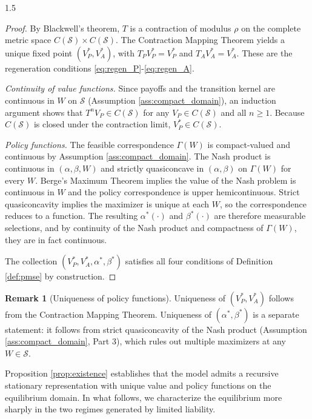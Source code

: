 \documentclass[12pt]{article}
\theoremstyle{definition}
\newtheorem{remark}{Remark}[section]
\theoremstyle{plain}
\begin{document}
\begin{spacing}{1.5}
\begin{proof}
By Blackwell's theorem, $T$ is a contraction of modulus $\rho$ on the complete metric space $C(\mathcal{S}) \times C(\mathcal{S})$. The Contraction Mapping Theorem \parencite[Theorem 3.2]{stokey1989} yields a unique fixed point $(V_P^*, V_A^*)$, with $T_P V_P^* = V_P^*$ and $T_A V_A^* = V_A^*$. These are the regeneration conditions \eqref{eq:regen_P}-\eqref{eq:regen_A}.

\textit{Continuity of value functions.} Since payoffs and the transition kernel are continuous in $W$ on $\mathcal{S}$ (Assumption \ref{ass:compact_domain}), an induction argument shows that $T^n V_P \in C(\mathcal{S})$ for any $V_P \in C(\mathcal{S})$ and all $n \geq 1$. Because $C(\mathcal{S})$ is closed under the contraction limit, $V_P^* \in C(\mathcal{S})$.

\textit{Policy functions.} The feasible correspondence $\Gamma(W)$ is compact-valued and continuous by Assumption \ref{ass:compact_domain}. The Nash product is continuous in $(\alpha,\beta,W)$ and strictly quasiconcave in $(\alpha,\beta)$ on $\Gamma(W)$ for every $W$. Berge's Maximum Theorem implies the value of the Nash problem is continuous in $W$ and the policy correspondence is upper hemicontinuous. Strict quasiconcavity implies the maximizer is unique at each $W$, so the correspondence reduces to a function. The resulting $\alpha^*(\cdot)$ and $\beta^*(\cdot)$ are therefore measurable selections, and by continuity of the Nash product and compactness of $\Gamma(W)$, they are in fact continuous.

The collection $(V_P^*, V_A^*, \alpha^*, \beta^*)$ satisfies all four conditions of Definition \ref{def:pmse} by construction.
\end{proof}

\begin{remark}[Uniqueness of policy functions]
Uniqueness of $(V_P^*, V_A^*)$ follows from the Contraction Mapping Theorem. Uniqueness of $(\alpha^*, \beta^*)$ is a separate statement: it follows from strict quasiconcavity of the Nash product (Assumption \ref{ass:compact_domain}, Part 3), which rules out multiple maximizers at any $W \in \mathcal{S}$.
\end{remark}

Proposition \ref{prop:existence} establishes that the model admits a recursive stationary representation with unique value and policy functions on the equilibrium domain. In what follows, we characterize the equilibrium more sharply in the two regimes generated by limited liability.


\end{spacing}
\end{document}
